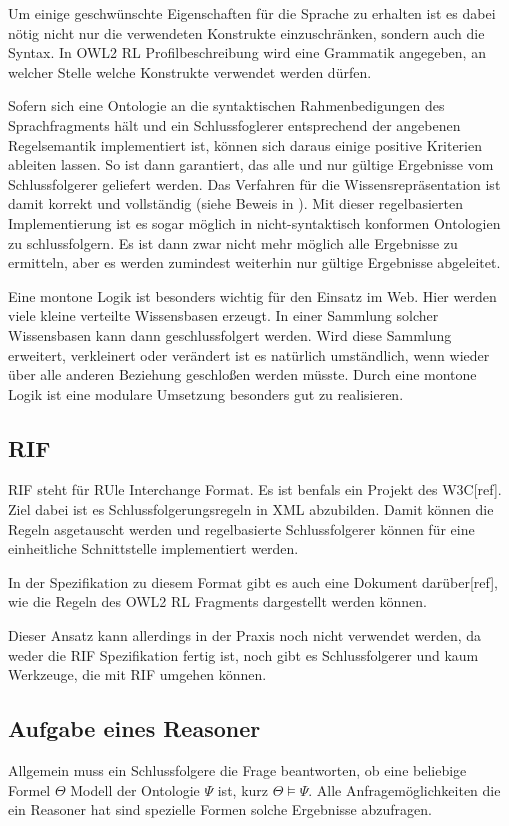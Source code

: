 Um einige geschwünschte Eigenschaften für die Sprache zu erhalten ist es dabei nötig nicht nur die verwendeten Konstrukte einzuschränken, sondern auch die Syntax. In OWL2 RL Profilbeschreibung wird eine Grammatik angegeben, an welcher Stelle welche Konstrukte verwendet werden dürfen.

Sofern sich eine Ontologie an die syntaktischen Rahmenbedigungen des Sprachfragments hält und ein Schlussfoglerer entsprechend der angebenen Regelsemantik implementiert ist, können sich daraus einige positive Kriterien ableiten lassen. So ist dann garantiert, das alle und nur gültige Ergebnisse vom Schlussfolgerer geliefert werden. Das Verfahren für die Wissensrepräsentation ist damit korrekt und vollständig (siehe Beweis in \cite{OWL2Profiles}).
Mit dieser regelbasierten Implementierung ist es sogar möglich in nicht-syntaktisch konformen Ontologien zu schlussfolgern. Es ist dann zwar nicht mehr möglich alle Ergebnisse zu ermitteln, aber es werden zumindest weiterhin nur gültige Ergebnisse abgeleitet.

Eine montone Logik ist besonders wichtig für den Einsatz im Web. Hier werden viele kleine verteilte Wissensbasen erzeugt. In einer Sammlung solcher Wissensbasen kann dann geschlussfolgert werden. Wird diese Sammlung erweitert, verkleinert oder verändert ist es natürlich umständlich, wenn wieder über alle anderen Beziehung geschloßen werden müsste. Durch eine montone Logik ist eine modulare Umsetzung besonders gut zu realisieren.


\subsection{RIF}
\label{abschnitt-rif}
RIF steht für RUle Interchange Format. Es ist benfals ein Projekt des W3C[ref]. Ziel dabei ist es Schlussfolgerungsregeln in XML abzubilden. Damit können die Regeln asgetauscht werden und regelbasierte Schlussfolgerer können für eine einheitliche Schnittstelle implementiert werden.

In der Spezifikation zu diesem Format gibt es auch eine Dokument darüber[ref], wie die Regeln des OWL2 RL Fragments dargestellt werden können.

Dieser Ansatz kann allerdings in der Praxis noch nicht verwendet werden, da weder die RIF Spezifikation fertig ist, noch gibt es Schlussfolgerer und kaum Werkzeuge, die mit RIF umgehen können.


\subsection{Aufgabe eines Reasoner}
Allgemein muss ein Schlussfolgere die Frage beantworten, ob eine beliebige Formel $\Theta$ Modell der Ontologie $\Psi$ ist, kurz $\Theta \models \Psi$. Alle Anfragemöglichkeiten die ein Reasoner hat sind spezielle Formen solche Ergebnisse abzufragen.

